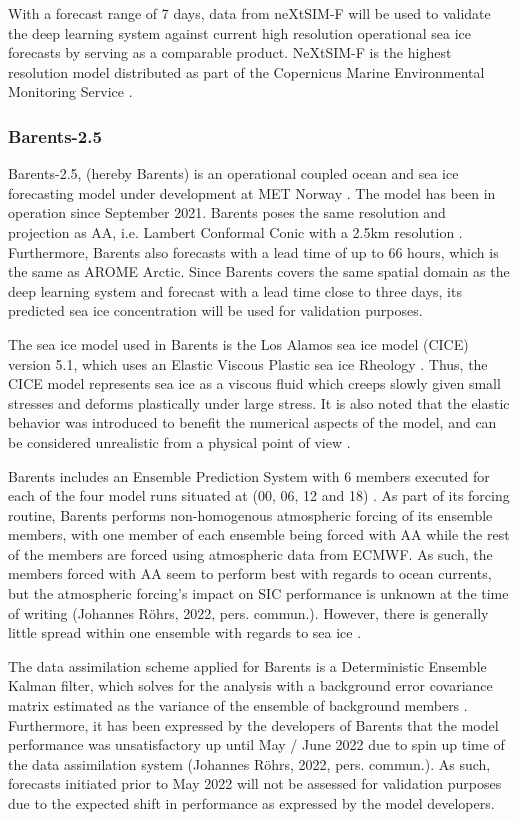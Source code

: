 \documentclass[../main/thesis.tex]{subfiles}
\begin{document}
With a forecast range of 7 days, data from neXtSIM-F will be used to validate the deep learning system against current high resolution operational sea ice forecasts by serving as a comparable product. NeXtSIM-F is the highest resolution model distributed as part of the Copernicus Marine Environmental Monitoring Service \citep{nextsimdata2020}.

\subsubsection{Barents-2.5}
Barents-2.5, (hereby Barents) is an operational coupled ocean and sea ice forecasting model under development at MET Norway \citep{Roehrs2022}. The model has been in operation since September 2021. Barents poses the same resolution and projection as AA, i.e. Lambert Conformal Conic with a 2.5km resolution \citep{Roehrs2022,Mueller2017}. Furthermore, Barents also forecasts with a lead time of up to 66 hours, which is the same as AROME Arctic. Since Barents covers the same spatial domain as the deep learning system and forecast with a lead time close to three days, its predicted sea ice concentration will be used for validation purposes.

The sea ice model used in Barents is the Los Alamos sea ice model (CICE) version 5.1, which uses an Elastic Viscous Plastic sea ice Rheology \citep{Hunke2015}. Thus, the CICE model represents sea ice as a viscous fluid which creeps slowly given small stresses and deforms plastically under large stress. It is also noted that the elastic behavior was introduced to benefit the numerical aspects of the model, and can be considered unrealistic from a physical point of view \citep{Hunke1997}.

Barents includes an Ensemble Prediction System with 6 members executed for each of the four model runs situated at (00, 06, 12 and 18) \citep{Roehrs2022}. As part of its forcing routine, Barents performs non-homogenous atmospheric forcing of its ensemble members, with one member of each ensemble being forced with AA while the rest of the members are forced using atmospheric data from ECMWF. As such, the members forced with AA seem to perform best with regards to ocean currents, but the atmospheric forcing's impact on SIC performance is unknown at the time of writing (Johannes Röhrs, 2022, pers. commun.). However, there is generally little spread within one ensemble with regards to sea ice \citep{Roehrs2022}.

The data assimilation scheme applied for Barents is a Deterministic Ensemble Kalman filter, which solves for the analysis with a background error covariance matrix estimated as the variance of the ensemble of background members \citep{Roehrs2022}. Furthermore, it has been expressed by the developers of Barents that the model performance was unsatisfactory up until May / June 2022 due to spin up time of the data assimilation system (Johannes Röhrs, 2022, pers. commun.). As such, forecasts initiated prior to May 2022 will not be assessed for validation purposes due to the expected shift in performance as expressed by the model developers.
\end{document}
